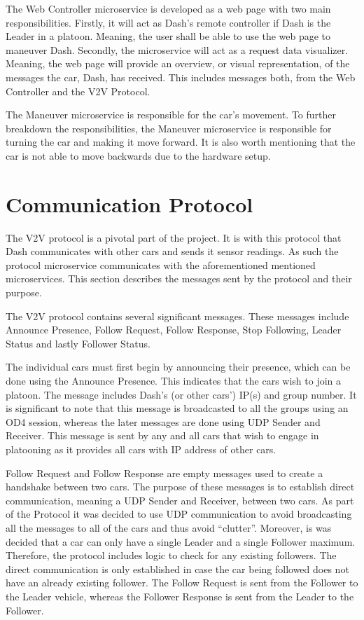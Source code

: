 \documentclass[12pt]{article}
\begin{document}
The Web Controller microservice is developed as a web page with two main responsibilities. Firstly, it will act as Dash’s remote controller if Dash is the Leader in a platoon. Meaning, the user shall be able to use the web page to maneuver Dash. Secondly, the microservice will act as a request data visualizer. Meaning, the web page will provide an overview, or visual representation, of the messages the car, Dash, has received. This includes messages both, from the Web Controller and the V2V Protocol. \par  

The Maneuver microservice is responsible for the car’s movement. To further breakdown the responsibilities, the Maneuver microservice is responsible for turning the car and making it move forward. It is also worth mentioning that the car is not able to move backwards due to the hardware setup.\par


\section{Communication Protocol}
The V2V protocol is a pivotal part of the project. It is with this protocol that Dash communicates with other cars and sends it sensor readings. As such the protocol microservice communicates with the aforementioned mentioned microservices. This section describes the messages sent by the protocol and their purpose. \par

The V2V protocol contains several significant messages. These messages include Announce Presence, Follow Request, Follow Response, Stop Following, Leader Status and lastly Follower Status. \par

The individual cars must first begin by announcing their presence, which can be done using the Announce Presence. This indicates that the cars wish to join a platoon. The message includes Dash’s (or other cars’) IP(s) and group number. It is significant to note that this message is broadcasted to all the groups using an OD4 session, whereas the later messages are done using UDP Sender and Receiver. This message is sent by any and all cars that wish to engage in platooning as it provides all cars with IP address of other cars. \par

Follow Request and Follow Response are empty messages used to create a handshake between two cars. The purpose of these messages is to establish direct communication, meaning a UDP Sender and Receiver, between two cars. As part of the Protocol it was decided to use UDP communication to avoid broadcasting all the messages to all of the cars and thus avoid “clutter”. Moreover, is was decided that a car can only have a single Leader and a single Follower maximum. Therefore, the protocol includes logic to check for any existing followers. The direct communication is only established in case the car being followed does not have an already existing follower. The Follow Request is sent from the Follower to the Leader vehicle, whereas the Follower Response is sent from the Leader to the Follower. \par
\end{document}
